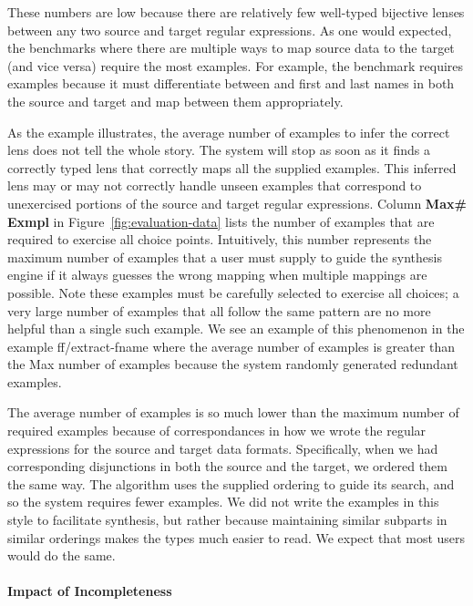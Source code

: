\documentclass[numbers,10pt,preprint\ifanon ,nocopyrightspace\fi]{sigplanconf}
\begin{document}
These numbers are low because there are relatively few well-typed
bijective lenses between any two source and target regular expressions. 
As one would expected, the benchmarks where there are multiple ways to
map source data to the target (and vice versa) require the most examples.
For example, the benchmark  requires examples because it
must differentiate between and first and last names in both the
source and target and map between them appropriately.

As the  example illustrates, the average number of examples to
infer the correct lens does not tell the whole story.  The system will
stop as soon as it finds a correctly typed lens that correctly maps
all the supplied examples.  This inferred lens may or may not
correctly handle unseen examples that correspond to
unexercised portions of the source and target regular expressions.
Column \textbf{Max\# Exmpl} in Figure~\ref{fig:evaluation-data} lists
the number of examples that are required to exercise all choice
points.  Intuitively, this number represents the maximum number of
examples that a user must supply to guide the synthesis engine if it
always guesses the wrong mapping when multiple mappings are possible.
Note these examples must be carefully selected to exercise all
choices; a very large number of examples that all follow the same
pattern are no more helpful than a single such example.  We see an
example of this phenomenon in the example ff/extract-fname where the
average number of examples is greater than the Max number of examples
because the system randomly generated redundant examples.

The average number of examples is so much lower than the maximum
number of required examples because of correspondances in how we wrote
the regular expressions for the source and target data formats. 
Specifically, when we had corresponding disjunctions in both the
source and the target, we ordered them the same way.  The algorithm
uses the supplied ordering to guide its search, and so the system
requires fewer examples.   We did not write the examples in this style
to facilitate synthesis, but rather because maintaining similar
subparts in similar orderings makes the types much easier to 
read. We expect that most users would do the same.


\paragraph*{Impact of Incompleteness}
\end{document}
